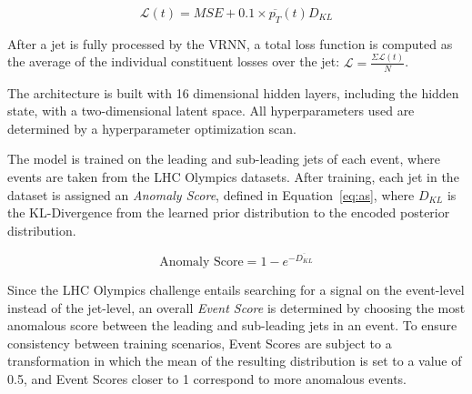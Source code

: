 \documentclass[letterpaper,11pt]{article}
\begin{document}
\begin{equation}
\mathcal{L}(t)=MSE+0.1 \times \overline{p_T}(t)D_{KL}
\end{equation}

After a jet is fully processed by the VRNN, a total loss function is computed as the average of the individual constituent losses over the jet: $\mathcal{L} = \frac{\Sigma \mathcal{L}(t)}{N}$.

The architecture is built with 16 dimensional hidden layers, including the hidden state, with a two-dimensional latent space. All hyperparameters used are determined by a hyperparameter optimization scan. 

The model is trained on the leading and sub-leading jets of each event, where events are taken from the LHC Olympics datasets. 
After training, each jet in the dataset is assigned an \textit{Anomaly Score}, defined in Equation~\ref{eq:as}, where $D_{KL}$ is the KL-Divergence from the learned prior distribution to the encoded posterior distribution.

\begin{equation}
\label{eq:as}
\text{Anomaly Score} = 1 - e^{-\overline{D_{KL}}}
\end{equation}

Since the LHC Olympics challenge entails searching for a signal on the event-level instead of the jet-level, an overall \textit{Event Score} is determined by choosing the most anomalous score between the leading and sub-leading jets in an event. 
To ensure consistency between training scenarios, Event Scores are subject to a transformation in which the mean of the resulting distribution is set to a value of 0.5, and Event Scores closer to 1 correspond to more anomalous events. 
\end{document}
